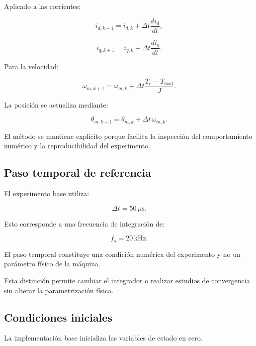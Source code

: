 Aplicado a las corrientes:

\begin{equation}
i_{d,k+1}
=
i_{d,k}
+
\Delta t
\frac{di_d}{dt},
\end{equation}

\begin{equation}
i_{q,k+1}
=
i_{q,k}
+
\Delta t
\frac{di_q}{dt}.
\end{equation}

Para la velocidad:

\begin{equation}
\omega_{m,k+1}
=
\omega_{m,k}
+
\Delta t
\frac{T_e-T_{\mathrm{load}}}{J}.
\end{equation}

La posición se actualiza mediante:

\begin{equation}
\theta_{m,k+1}
=
\theta_{m,k}
+
\Delta t\,\omega_{m,k}.
\end{equation}

El método se mantiene explícito porque facilita la inspección del comportamiento numérico y la reproducibilidad del experimento.

\subsection{Paso temporal de referencia}

El experimento base utiliza:

\begin{equation}
\Delta t=50\,\mu\mathrm{s}.
\end{equation}

Esto corresponde a una frecuencia de integración de:

\begin{equation}
f_s=20\,\mathrm{kHz}.
\end{equation}

El paso temporal constituye una condición numérica del experimento y no un parámetro físico de la máquina.

Esta distinción permite cambiar el integrador o realizar estudios de convergencia sin alterar la parametrización física.

\subsection{Condiciones iniciales}

La implementación base inicializa las variables de estado en cero.

